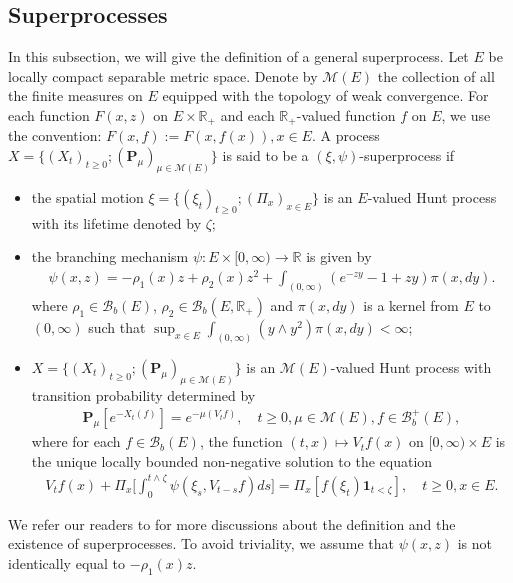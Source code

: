 \documentclass[12pt,a4paper]{amsart}
\theoremstyle{plain}
\theoremstyle{definition}
\numberwithin{equation}{section}
\begin{document}
\subsection{Superprocesses}
\label{sec: definition of superprocess}
In this subsection, we will give the definition of a general superprocess.
Let $E$ be locally compact separable metric space. Denote by $\mathcal M(E)$ the collection of all the finite measures on $E$ equipped with the topology of weak convergence.
For each function $F(x,z)$ on $E\times \mathbb R_+$ and each $\mathbb R_+$-valued function $f$ on $E$,
we use the  convention:
$
  F(x,f)
  := F(x,f(x)),
  x\in E.
$
A process $X=\{(X_t)_{t\geq 0}; (\mathbf P_\mu)_{\mu \in \mathcal M(E)}\}$ is said to be a $(\xi,\psi)$-superprocess if
\begin{itemize}
\item
  the spatial motion $\xi=\{(\xi_t)_{t\geq 0};(\Pi_x)_{x\in E}\}$ is an $E$-valued Hunt process with its lifetime denoted by $\zeta$;
\item
  the branching mechanism $\psi: E\times[0,\infty) \to \mathbb R$ is given by
\begin{align}
  \label{eq: branching mechanism}
  \psi(x,z)=
  -\rho_1(x) z + \rho_2 (x) z^2 + \int_{(0,\infty)} (e^{-zy} - 1 + zy) \pi(x,dy).
\end{align}
where $\rho_1 \in \mathcal B_b(E)$, $\rho_2 \in \mathcal B_b(E, \mathbb R_+)$ and $\pi(x,dy)$ is a kernel from $E$ to $(0,\infty)$ such that $\sup_{x\in E} \int_{(0,\infty)} (y\wedge y^2) \pi(x,dy) < \infty$;
\item
  $X=\{(X_t)_{t\geq 0}; (\mathbf P_\mu)_{\mu \in \mathcal M(E)}\}$ is an $\mathcal M(E)$-valued Hunt process with transition probability determined by
  \begin{align}
    \mathbf P_\mu [e^{-X_t(f)}] = e^{-\mu(V_tf)},
    \quad t\geq 0, \mu \in \mathcal M(E), f\in \mathcal B^+_b(E),
  \end{align}
  where for each $f\in \mathcal B_b(E)$, the function $(t,x)\mapsto V_tf(x)$ on $[0,\infty) \times E$ is the unique locally bounded non-negative solution to the equation
  \begin{align}
    \label{eq:FKPP_in_definition}
    V_tf(x) + \Pi_x \Big[  \int_0^{t\wedge \zeta} \psi(\xi_s,V_{t-s}f)ds \Big]
    = \Pi_x [ f(\xi_t)\mathbf 1_{t<\zeta} ],
    \quad t \geq 0, x \in E.
  \end{align}
\end{itemize}
We refer our readers to \cite{Li2011Measure-valued} for more discussions about the definition and the existence of superprocesses.
To avoid triviality, we assume that $\psi(x,z)$ is not identically equal to $-\rho_1(x)z$.
\end{document}
